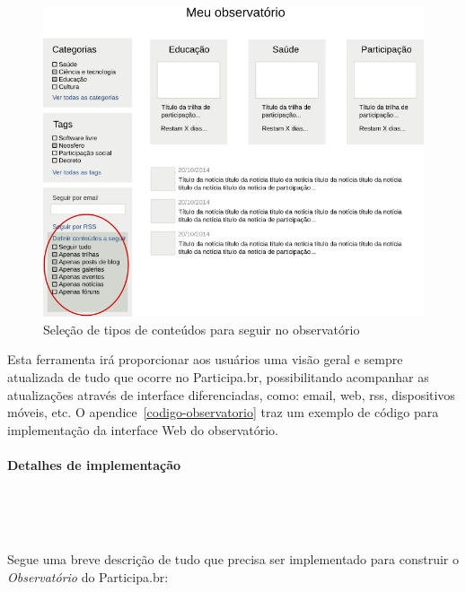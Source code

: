 \documentclass[12pt]{article}
\begin{document}
\begin{figure}[h!]
\center
\includegraphics[scale=0.5]{observatorio-tipos-conteudo.png}
\caption{Seleção de tipos de conteúdos para seguir no observatório}
\label{observatorio-conteudo}
\end{figure}

Esta ferramenta irá proporcionar aos usuários uma visão geral e sempre
atualizada de tudo que ocorre no Participa.br, possibilitando acompanhar as
atualizações através de interface diferenciadas, como: email, web, rss,
dispositivos móveis, etc. O apendice~\ref{codigo-observatorio} traz um exemplo
de código para implementação da interface Web do observatório.

\paragraph{Detalhes de implementação} \

\

Segue uma breve descrição de tudo que precisa ser implementado para construir
o {\it Observatório} do Participa.br:
\end{document}
